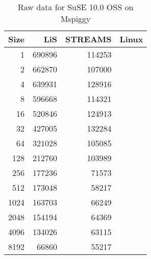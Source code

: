\documentclass[letterpaper,final,notitlepage,twocolumn,10pt,twoside]{article}
\let\normalsize = \small
\let\small = \footnotesize
\let\footnotesize = \scriptsize
\let\scriptsize = \tiny
\begin{document}
\begin{appendix}
\begin{table}[hp]
\footnotesize
\setlength{\tabcolsep}{0.3em}
\setlength{\arraycolsep}{0.3em}
\begin{center}
\begin{tabular}{rrrr}\\
\hline
Size & LiS & STREAMS & Linux\\
\hline
\hline
1 & 690896 & 114253\\
2 & 662870 & 107000\\
4 & 639931 & 128916\\
8 & 596668 & 114321\\
16 & 520846 & 124913\\
32 & 427005 & 132284\\
64 & 321028 & 105085\\
128 & 212760 & 103989\\
256 & 177236 & 71573\\
512 & 173048 & 58217\\
1024 & 163703 & 66249\\
2048 & 154194 & 64369\\
4096 & 134026 & 63115\\
8192 & 66860 & 55217\\
\hline
\end{tabular}
\end{center}
\caption{Raw data for SuSE 10.0 OSS on Mspiggy}
\label{table:nbdata}
\normalsize
\end{table}

\end{appendix}
\end{document}
